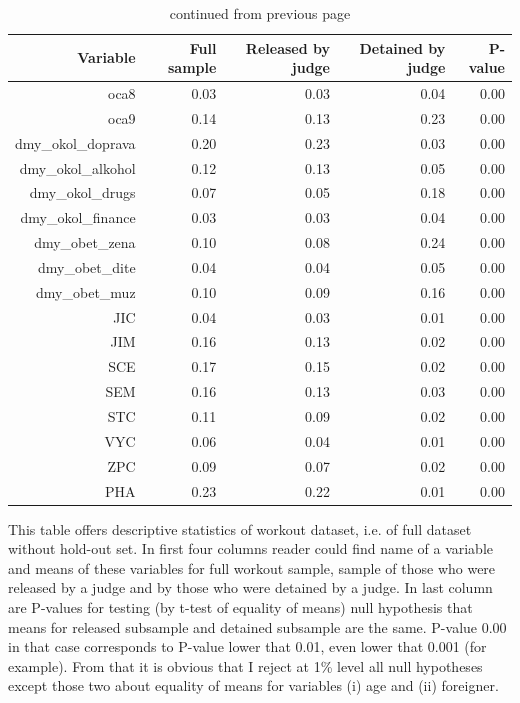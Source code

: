 \documentclass[12pt, twoside]{book} %
\begin{document}
\begin{table}[H]
\centering
\begin{tabular}{rrrrr}
  \hline
 Variable & Full sample & Released by judge & Detained by judge & P-value \\ 
  \hline
  oca8 & 0.03 & 0.03 & 0.04 & 0.00 \\ 
  oca9 & 0.14 & 0.13 & 0.23 & 0.00 \\ 
  dmy\_okol\_doprava & 0.20 & 0.23 & 0.03 & 0.00 \\ 
  dmy\_okol\_alkohol & 0.12 & 0.13 & 0.05 & 0.00 \\ 
  dmy\_okol\_drugs & 0.07 & 0.05 & 0.18 & 0.00 \\ 
  dmy\_okol\_finance & 0.03 & 0.03 & 0.04 & 0.00 \\ 
  dmy\_obet\_zena & 0.10 & 0.08 & 0.24 & 0.00 \\ 
  dmy\_obet\_dite & 0.04 & 0.04 & 0.05 & 0.00 \\ 
  dmy\_obet\_muz & 0.10 & 0.09 & 0.16 & 0.00 \\ 
  JIC & 0.04 & 0.03 & 0.01 & 0.00 \\ 
  JIM & 0.16 & 0.13 & 0.02 & 0.00 \\ 
  SCE & 0.17 & 0.15 & 0.02 & 0.00 \\ 
  SEM & 0.16 & 0.13 & 0.03 & 0.00 \\ 
  STC & 0.11 & 0.09 & 0.02 & 0.00 \\ 
  VYC & 0.06 & 0.04 & 0.01 & 0.00 \\ 
  ZPC & 0.09 & 0.07 & 0.02 & 0.00 \\ 
  PHA & 0.23 & 0.22 & 0.01 & 0.00 \\ 
   \hline
\end{tabular}

\renewcommand\thetable{2.3}
 \caption{continued from previous page}
\medskip
{\small This table offers descriptive statistics of workout dataset, i.e. of full dataset without hold-out set. In first four columns reader could find name of a variable and means of these variables for full workout sample, sample of those who were released by a judge and by those who were detained by a judge. In last column are P-values for testing (by t-test of equality of means) null hypothesis that means for released subsample and detained subsample are the same. P-value 0.00 in that case corresponds to P-value lower that 0.01, even lower that 0.001 (for example). From that it is obvious that I reject at 1\% level all null hypotheses except those two about equality of means for variables (i) age and (ii) foreigner.}

\end{table}
\end{document}
